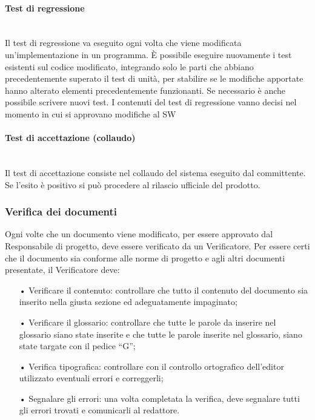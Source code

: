 \paragraph{Test di regressione}\mbox{}\\
Il test di regressione va eseguito ogni volta che viene modificata un'implementazione in un programma. È possibile eseguire nuovamente i test esistenti sul codice modificato, integrando solo le parti che abbiano precedentemente superato il test di unità, per stabilire se le modifiche apportate hanno alterato elementi precedentemente funzionanti. Se necessario è anche possibile scrivere nuovi test. 
\newline
I contenuti del test di regressione vanno decisi nel momento in cui si approvano modifiche al SW


\paragraph{Test di accettazione (collaudo)}\mbox{}\\
Il test di accettazione consiste nel collaudo del sistema eseguito dal committente. Se l'esito è positivo si può procedere al rilascio ufficiale del prodotto.

\subsubsection{Verifica dei documenti}
Ogni volte che un documento viene modificato, per essere approvato dal Responsabile di progetto, deve essere verificato da un Verificatore. 
\newline
Per essere certi che il documento sia conforme alle norme di progetto e agli altri documenti presentate, il Verificatore deve:
\begin{itemize}
\item[•] Verificare il contenuto: controllare che tutto il contenuto del documento sia inserito nella giusta sezione ed adeguatamente impaginato;
\item[•] Verificare il glossario: controllare che tutte le parole da inserire nel glossario siano state inserite e che tutte le parole inserite nel glossario, siano state targate con il pedice “G”;
\item[•] Verifica tipografica: controllare con il controllo ortografico dell’editor utilizzato eventuali errori e correggerli;
\item[•] Segnalare gli errori: una volta completata la verifica, deve segnalare tutti gli errori trovati e comunicarli al redattore.
\end{itemize}
